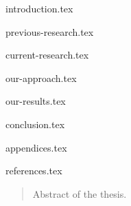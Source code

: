 \documentclass[a4paper,11px]{article}
\begin{document}
\newpage

{introduction.tex}

\newpage


{previous-research.tex}

\newpage


{current-research.tex}

\newpage


{our-approach.tex}

\newpage



{our-results.tex}

\newpage



{conclusion.tex}

\newpage



{appendices.tex}

\newpage




{references.tex}

\newpage



\begin{latin}
\begin{abstract}
Abstract of the thesis.
\end{abstract}
\end{latin}
\newpage
\end{document}
